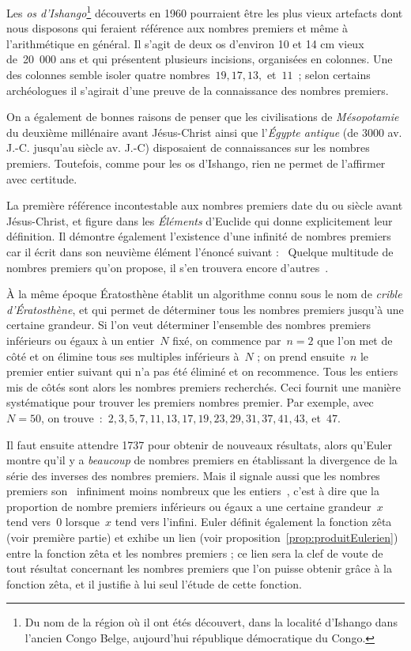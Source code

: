 		\medskip
		Les \emph{os d'Ishango}\footnote{Du nom de la région où il ont étés découvert, dans la localité d'Ishango dans l'ancien Congo Belge, aujourd'hui république démocratique du Congo.} découverts en 1960 pourraient être les plus vieux artefacts dont nous disposons qui feraient référence aux nombres premiers et même à l'arithmétique en général. Il s'agit de deux os d'environ 10 et 14 cm vieux de~20~000 ans et qui présentent plusieurs incisions, organisées en colonnes. Une des colonnes semble isoler quatre nombres~$19,17,13,$ et~$11$~; selon certains archéologues il s'agirait d'une preuve de la connaissance des nombres premiers.
		
		On a également de bonnes raisons de penser que les civilisations de \emph{Mésopotamie} du deuxième millénaire avant Jésus-Christ ainsi que l'\emph{Égypte antique} (de 3000 av. J.-C. jusqu'au  siècle av. J.-C) disposaient de connaissances sur les nombres premiers. Toutefois, comme pour les os d'Ishango, rien ne permet de l'affirmer avec certitude.
		
		La première référence incontestable aux nombres premiers date du  ou  siècle avant Jésus-Christ, et figure dans les \emph{Éléments} d'Euclide qui donne explicitement leur définition. Il démontre également l'existence d'une infinité de nombres premiers car il écrit dans son neuvième élément l'énoncé suivant : \og~Quelque multitude de nombres premiers qu'on propose, il s'en trouvera encore d'autres~\fg.
		
		À la même époque Ératosthène établit un algorithme connu sous le nom de \emph{crible d'Ératosthène}, et qui permet de déterminer tous les nombres premiers jusqu'à une certaine grandeur. Si l'on veut déterminer l'ensemble des nombres premiers inférieurs ou égaux à un entier~$N$ fixé, on commence par~$n=2$ que l'on met de côté et on élimine tous ses multiples inférieurs à~$N$ ; on prend ensuite~$n$ le premier entier suivant qui n'a pas été éliminé et on recommence. Tous les entiers mis de côtés sont alors les nombres premiers recherchés. Ceci fournit une manière systématique pour trouver les premiers nombres premier. Par exemple, avec~$N= 50$, on trouve~:~$2,3,5,7,11,13,17,19,23,29,31,37,41,43$, et~$47$.
				
		Il faut ensuite attendre 1737 pour obtenir de nouveaux résultats, alors qu'Euler montre qu'il y a \emph{beaucoup} de nombres premiers en établissant la divergence de la série des inverses des nombres premiers. Mais il signale aussi que les nombres premiers son \og~infiniment moins nombreux que les entiers~\fg, c'est à dire que la proportion de nombre premiers inférieurs ou égaux a une certaine grandeur~$x$ tend vers~$0$ lorsque~$x$ tend vers l'infini. Euler définit également la fonction zêta (voir première partie) et exhibe un lien (voir proposition~\ref{prop:produitEulerien}) entre la fonction zêta et les nombres premiers ; ce lien sera la clef de voute de tout résultat concernant les nombres premiers que l'on puisse obtenir grâce à la fonction zêta, et il justifie à lui seul l'étude de cette fonction.
		
